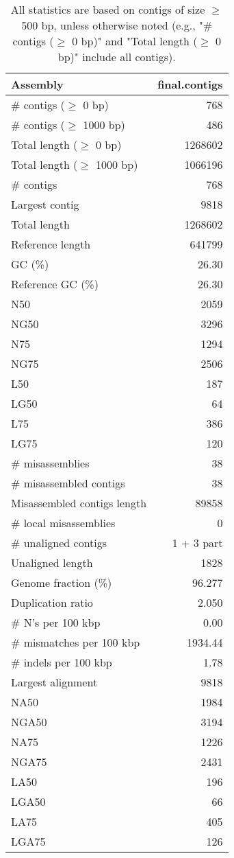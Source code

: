 \documentclass[12pt,a4paper]{article}
\begin{document}
\begin{table}[ht]
\begin{center}
\caption{All statistics are based on contigs of size $\geq$ 500 bp, unless otherwise noted (e.g., "\# contigs ($\geq$ 0 bp)" and "Total length ($\geq$ 0 bp)" include all contigs).}
\begin{tabular}{|l*{1}{|r}|}
\hline
Assembly & final.contigs \\ \hline
\# contigs ($\geq$ 0 bp) & 768 \\ \hline
\# contigs ($\geq$ 1000 bp) & 486 \\ \hline
Total length ($\geq$ 0 bp) & 1268602 \\ \hline
Total length ($\geq$ 1000 bp) & 1066196 \\ \hline
\# contigs & 768 \\ \hline
Largest contig & 9818 \\ \hline
Total length & 1268602 \\ \hline
Reference length & 641799 \\ \hline
GC (\%) & 26.30 \\ \hline
Reference GC (\%) & 26.30 \\ \hline
N50 & 2059 \\ \hline
NG50 & 3296 \\ \hline
N75 & 1294 \\ \hline
NG75 & 2506 \\ \hline
L50 & 187 \\ \hline
LG50 & 64 \\ \hline
L75 & 386 \\ \hline
LG75 & 120 \\ \hline
\# misassemblies & 38 \\ \hline
\# misassembled contigs & 38 \\ \hline
Misassembled contigs length & 89858 \\ \hline
\# local misassemblies & 0 \\ \hline
\# unaligned contigs & 1 + 3 part \\ \hline
Unaligned length & 1828 \\ \hline
Genome fraction (\%) & 96.277 \\ \hline
Duplication ratio & 2.050 \\ \hline
\# N's per 100 kbp & 0.00 \\ \hline
\# mismatches per 100 kbp & 1934.44 \\ \hline
\# indels per 100 kbp & 1.78 \\ \hline
Largest alignment & 9818 \\ \hline
NA50 & 1984 \\ \hline
NGA50 & 3194 \\ \hline
NA75 & 1226 \\ \hline
NGA75 & 2431 \\ \hline
LA50 & 196 \\ \hline
LGA50 & 66 \\ \hline
LA75 & 405 \\ \hline
LGA75 & 126 \\ \hline
\end{tabular}
\end{center}
\end{table}
\end{document}
